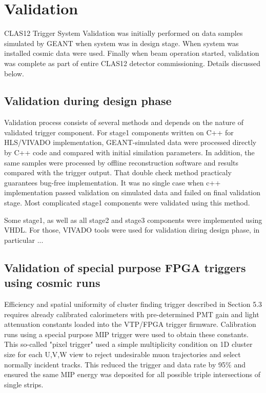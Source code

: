 \section{Validation}

CLAS12 Trigger System Validation was initially performed on data samples simulated by GEANT when system was in design stage. When system was installed cosmic data were used. Finally when beam operation started, validation was complete as part of entire CLAS12 detector commissioning. Details discussed below.

\subsection{Validation during design phase}

Validation process consists of several methods and depends on the nature of validated trigger component. For stage1 components written on C++ for HLS/VIVADO implementation,
GEANT-simulated data were processed directly by C++ code and compared with initial similation parameters. 
In addition, the same samples were processed by offline reconstruction software and results compared with the trigger output. 
That double check method practicaly guarantees bug-free implementation. It was no single case when c++ implementation passed validation on
simulated data and failed on final validation stage. Most complicated stage1 components were validated using this method.

Some stage1, as well as all stage2 and stage3 components were implemented using VHDL. For those, VIVADO tools were used for validation diring design phase, in particular ...

\subsection{Validation of special purpose FPGA triggers using cosmic runs} 

Efficiency and spatial uniformity of cluster finding trigger described in Section 5.3 requires already calibrated calorimeters with pre-determined PMT gain and light attenuation constants loaded into the VTP/FPGA trigger firmware.  Calibration runs using a special purpose MIP trigger were used to obtain these constants.  This so-called "pixel trigger" used a simple multiplicity condition on 1D cluster size for each U,V,W view to reject undesirable muon trajectories and select normally incident tracks.  This reduced the trigger and data rate by 95$\%$ and ensured the same MIP energy was deposited for all possible triple intersections of single strips.  

